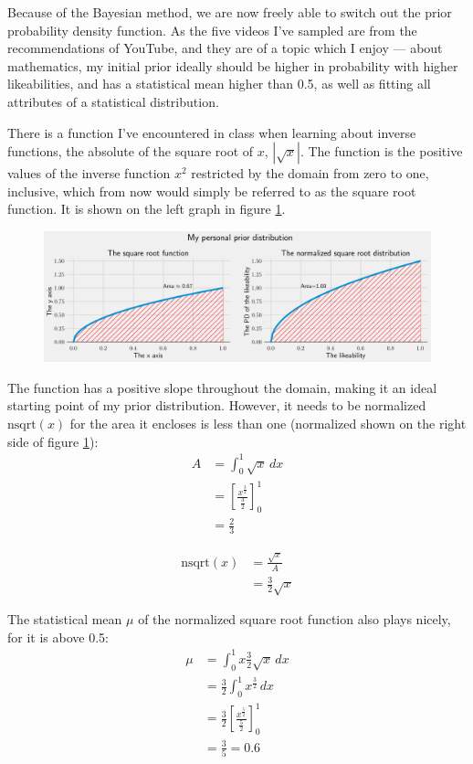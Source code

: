 \documentclass[a4paper,11pt]{article}
\begin{document}
Because of the Bayesian method, we are now freely able to switch out the prior probability density function. As the five videos I've sampled are from the recommendations of YouTube, and they are of a topic which I enjoy --- about mathematics, my initial prior ideally should be higher in probability with higher likeabilities, and has a statistical mean higher than 0.5, as well as fitting all attributes of a statistical distribution.

There is a function I've encountered in class when learning about inverse functions, the absolute of the square root of $x$, $|\sqrt{x}|$. The function is the positive values of the inverse function $x^2$ restricted by the domain from zero to one, inclusive, which from now would simply be referred to as the square root function. It is shown on the left graph in figure \ref{fig:sqrt_per}.

\begin{figure}[H]
    \centering
    \includegraphics[width=\textwidth]{assets/sqrt_per.png}
    \caption{}
    \label{fig:sqrt_per}
\end{figure}

The function has a positive slope throughout the domain, making it an ideal starting point of my prior distribution. However, it needs to be normalized $\text{nsqrt}(x)$ for the area it encloses is less than one (normalized shown on the right side of figure \ref{fig:sqrt_per}):
\begin{align*}
    A &= \int_0^1 \sqrt{x} \, dx\\
    &= [\frac{x^{\frac{3}{2}}}{\frac{3}{2}}]^1_0\\
    &= \frac{2}{3}
\end{align*}

\begin{align*}
     \text{nsqrt}(x) &= \frac{\sqrt{x}}{A}\\
    &= \frac{3}{2} \sqrt{x}
\end{align*}

The statistical mean $\mu$ of the normalized square root function also plays nicely, for it is above 0.5:
\begin{align*}
    \mu &= \int_0^1 x \frac{3}{2} \sqrt{x} \, dx\\
    &= \frac{3}{2} \int_0^1 x^{\frac{3}{2}} \, dx\\
    &= \frac{3}{2} [\frac{x^{\frac{5}{2}}}{\frac{5}{2}}]^1_0\\
    &= \frac{3}{5} = 0.6
\end{align*}
\end{document}
